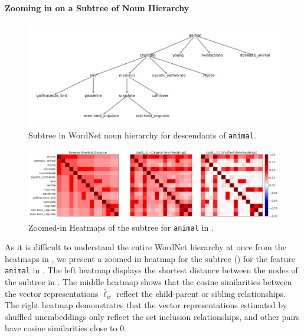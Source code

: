 \documentclass{article}
\newcommand{\ConceptValue}[1]{\texttt{#1}}
\begin{document}
\paragraph*{Zooming in on a Subtree of Noun Hierarchy}
\begin{figure}[t]
  \centering
  \includegraphics[width=1.0\linewidth]{figures/sub_graph_tree.pdf}
  \caption{Subtree in WordNet noun hierarchy for descendants of \ConceptValue{animal}.
  }
  \label{fig:sub_tree}
\end{figure}

\begin{figure}[t]
  \centering
  \includegraphics[width=1.0\linewidth]{figures/sub_heatmap_noun_gemma.pdf}
  \caption{Zoomed-in Heatmaps of the subtree for \ConceptValue{animal} in .
  }
  \label{fig:sub_heatmap_noun_gemma}
\end{figure}

As it is difficult to understand the entire WordNet hierarchy at once from the heatmaps in , we present a zoomed-in heatmap for the subtree () for the feature \ConceptValue{animal} in .
The left heatmap displays the shortest distance between the nodes of the subtree in .
The middle heatmap shows that the cosine similarities between the vector representations $\bar\ell_w$ reflect the child-parent or sibling relationships.
The right heatmap demonstrates that the vector representations estimated by shuffled unembeddings only reflect the set inclusion relationships, and other pairs have cosine similarities close to 0.
\end{document}
